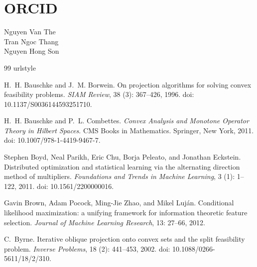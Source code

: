 \documentclass[]{interact}
\theoremstyle{plain}
\theoremstyle{definition}
\theoremstyle{remark}
\begin{document}
\section*{ORCID}
\noindent Nguyen Van The~\\
Tran Ngoc Thang~\\
Nguyen Hong Son~

\begin{thebibliography}{99}
\providecommand{\natexlab}[1]{#1}
\providecommand{\url}[1]{\texttt{#1}}
\expandafter\ifx\csname urlstyle\endcsname\relax
  \providecommand{\doi}[1]{doi: #1}\else
  \providecommand{\doi}{doi: \begingroup \urlstyle{rm}\Url}\fi

H.~H. Bauschke and J.~M. Borwein.
\newblock On projection algorithms for solving convex feasibility problems.
\newblock \emph{SIAM Review}, 38 (3): 367--426, 1996.
\newblock \doi{10.1137/S0036144593251710}.

H.~H. Bauschke and P.~L. Combettes.
\newblock \emph{Convex Analysis and Monotone Operator Theory in {H}ilbert Spaces}.
\newblock CMS Books in Mathematics. Springer, New York, 2011.
\newblock \doi{10.1007/978-1-4419-9467-7}.

Stephen Boyd, Neal Parikh, Eric Chu, Borja Peleato, and Jonathan Eckstein.
\newblock Distributed optimization and statistical learning via the alternating direction method of multipliers.
\newblock \emph{Foundations and Trends in Machine Learning}, 3 (1): 1--122, 2011.
\newblock \doi{10.1561/2200000016}.

Gavin Brown, Adam Pocock, Ming-Jie Zhao, and Mikel Luj{\'a}n.
\newblock Conditional likelihood maximization: a unifying framework for information theoretic feature selection.
\newblock \emph{Journal of Machine Learning Research}, 13: 27--66, 2012.

C.~Byrne.
\newblock Iterative oblique projection onto convex sets and the split feasibility problem.
\newblock \emph{Inverse Problems}, 18 (2): 441--453, 2002.
\newblock \doi{10.1088/0266-5611/18/2/310}.


\end{thebibliography}
\end{document}
